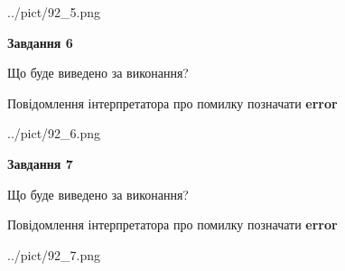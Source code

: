 \documentclass[10pt, ukrainian]{article}
\begin{document}
{\begin {large}
\begin{center}
	{../pict/92_5.png}
\end{center}
\newpage

{\begin {center}\textbf{Завдання 6}\end {center}}\par
Що буде виведено за виконання? \par
Повідомлення інтерпретатора про помилку позначати \textbf{error}

\begin{center}
	{../pict/92_6.png}
\end{center}
\newpage

{\begin {center}\textbf{Завдання 7}\end {center}}\par
Що буде виведено за виконання? \par
Повідомлення інтерпретатора про помилку позначати \textbf{error}

\begin{center}
	{../pict/92_7.png}
\end{center}
\newpage

\end {large}}
\end{document}
